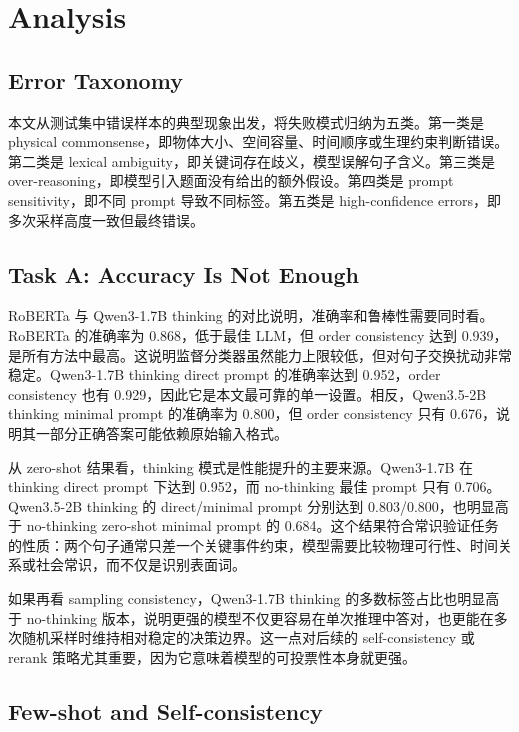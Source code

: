 \section{Analysis}

\subsection{Error Taxonomy}

本文从测试集中错误样本的典型现象出发，将失败模式归纳为五类。第一类是 physical commonsense，即物体大小、空间容量、时间顺序或生理约束判断错误。第二类是 lexical ambiguity，即关键词存在歧义，模型误解句子含义。第三类是 over-reasoning，即模型引入题面没有给出的额外假设。第四类是 prompt sensitivity，即不同 prompt 导致不同标签。第五类是 high-confidence errors，即多次采样高度一致但最终错误。

\subsection{Task A: Accuracy Is Not Enough}

RoBERTa 与 Qwen3-1.7B thinking 的对比说明，准确率和鲁棒性需要同时看。RoBERTa 的准确率为 0.868，低于最佳 LLM，但 order consistency 达到 0.939，是所有方法中最高。这说明监督分类器虽然能力上限较低，但对句子交换扰动非常稳定。Qwen3-1.7B thinking direct prompt 的准确率达到 0.952，order consistency 也有 0.929，因此它是本文最可靠的单一设置。相反，Qwen3.5-2B thinking minimal prompt 的准确率为 0.800，但 order consistency 只有 0.676，说明其一部分正确答案可能依赖原始输入格式。

从 zero-shot 结果看，thinking 模式是性能提升的主要来源。Qwen3-1.7B 在 thinking direct prompt 下达到 0.952，而 no-thinking 最佳 prompt 只有 0.706。Qwen3.5-2B thinking 的 direct/minimal prompt 分别达到 0.803/0.800，也明显高于 no-thinking zero-shot minimal prompt 的 0.684。这个结果符合常识验证任务的性质：两个句子通常只差一个关键事件约束，模型需要比较物理可行性、时间关系或社会常识，而不仅是识别表面词。

如果再看 sampling consistency，Qwen3-1.7B thinking 的多数标签占比也明显高于 no-thinking 版本，说明更强的模型不仅更容易在单次推理中答对，也更能在多次随机采样时维持相对稳定的决策边界。这一点对后续的 self-consistency 或 rerank 策略尤其重要，因为它意味着模型的可投票性本身就更强。

\subsection{Few-shot and Self-consistency}

